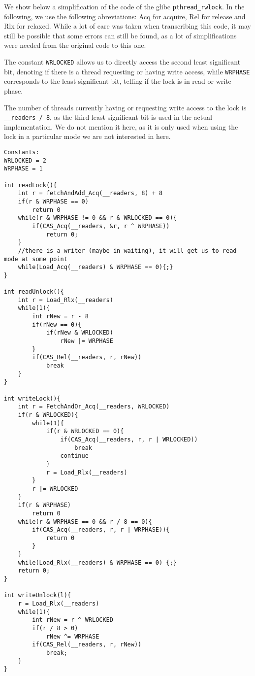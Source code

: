 We show below a simplification of the code of the glibc \texttt{pthread\_rwlock}. In the following, we use the following abreviations: Acq for acquire, Rel for release and Rlx for relaxed. While a lot of care was taken when transcribing this code, it may still be possible that some errors can still be found, as a lot of simplifications were needed from the original code to this one.

The constant \texttt{WRLOCKED} allows us to directly access the second least significant bit, denoting if there is a thread requesting or having write access, while \texttt{WRPHASE} corresponds to the least significant bit, telling if the lock is in read or write phase.

The number of threads currently having or requesting write access to the lock is \texttt{\_\_readers / 8}, as the third least significant bit is used in the actual implementation. We do not mention it here, as it is only used when using the lock in a particular mode we are not interested in here. 

\begin{lstlisting}
Constants:
WRLOCKED = 2
WRPHASE = 1

int readLock(){
	int r = fetchAndAdd_Acq(__readers, 8) + 8
	if(r & WRPHASE == 0)
		return 0
	while(r & WRPHASE != 0 && r & WRLOCKED == 0){
		if(CAS_Acq(__readers, &r, r ^ WRPHASE))
			return 0;
	}
	//there is a writer (maybe in waiting), it will get us to read mode at some point
	while(Load_Acq(__readers) & WRPHASE == 0){;}
}

int readUnlock(){
	int r = Load_Rlx(__readers)
	while(1){
		int rNew = r - 8
		if(rNew == 0){
			if(rNew & WRLOCKED)
				rNew |= WRPHASE
		}
		if(CAS_Rel(__readers, r, rNew))
			break
	}
}

int writeLock(){
	int r = FetchAndOr_Acq(__readers, WRLOCKED)
	if(r & WRLOCKED){
		while(1){
			if(r & WRLOCKED == 0){
				if(CAS_Acq(__readers, r, r | WRLOCKED))
					break
				continue
			}
			r = Load_Rlx(__readers)
		}
		r |= WRLOCKED
	}
	if(r & WRPHASE)
		return 0
	while(r & WRPHASE == 0 && r / 8 == 0){
		if(CAS_Acq(__readers, r, r | WRPHASE)){
			return 0
		}
	}
	while(Load_Rlx(__readers) & WRPHASE == 0) {;}
	return 0;
}

int writeUnlock(l){
	r = Load_Rlx(__readers)
	while(1){
		int rNew = r ^ WRLOCKED
		if(r / 8 > 0)
			rNew ^= WRPHASE
		if(CAS_Rel(__readers, r, rNew))
			break;
	}
}   
\end{lstlisting}
